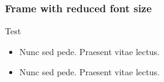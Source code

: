 \begin{framefont}{\small}

\begin{frame} %
\frametitle{Frame with reduced font size}
Test
\begin{itemize}
  \item Nunc sed pede. Praesent vitae lectus.
  \item Nunc sed pede. Praesent vitae lectus.
\end{itemize}

\end{frame}
\end{framefont}


